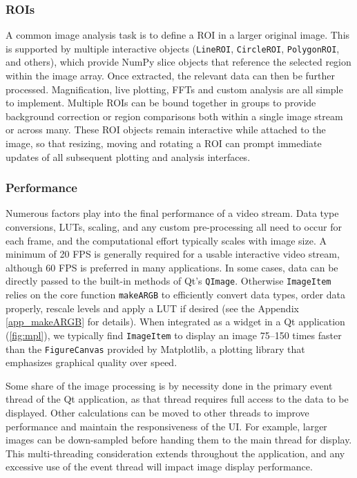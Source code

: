 \subsubsection{ROIs}

A common image analysis task is to define a ROI in a larger original image. This is supported by multiple interactive objects (\texttt{LineROI}, \texttt{CircleROI}, \texttt{PolygonROI}, and others), which provide NumPy slice objects that reference the selected region within the image array. Once extracted, the relevant data can then be further processed. Magnification, live plotting, FFTs and custom analysis are all simple to implement. Multiple ROIs can be bound together in groups to provide background correction or region comparisons both within a single image stream or across many. These ROI objects remain interactive while attached to the image, so that resizing, moving and rotating a ROI can prompt immediate updates of all subsequent plotting and analysis interfaces.

\subsubsection{Performance}

Numerous factors play into the final performance of a video stream. Data type conversions, LUTs, scaling, and any custom pre-processing all need to occur for each frame, and the computational effort typically scales with image size. A minimum of 20 FPS is generally required for a usable interactive video stream, although 60 FPS is preferred in many applications. In some cases, data can be directly passed to the built-in methods of Qt's \texttt{QImage}. Otherwise \texttt{ImageItem} relies on the core function \texttt{makeARGB} to efficiently convert data types, order data properly, rescale levels and apply a LUT if desired (see the Appendix \autoref{app_makeARGB} for details). When integrated as a widget in a Qt application (\autoref{fig:mpl}), we typically find \texttt{ImageItem} to display an image 75--150 times faster than the \texttt{FigureCanvas} provided by Matplotlib, a plotting library that emphasizes graphical quality over speed.

Some share of the image processing is by necessity done in the primary event thread of the Qt application, as that thread requires full access to the data to be displayed. Other calculations can be moved to other threads to improve performance and maintain the responsiveness of the UI. For example, larger images can be down-sampled before handing them to the main thread for display. This multi-threading consideration extends throughout the application, and any excessive use of the event thread will impact image display performance.

